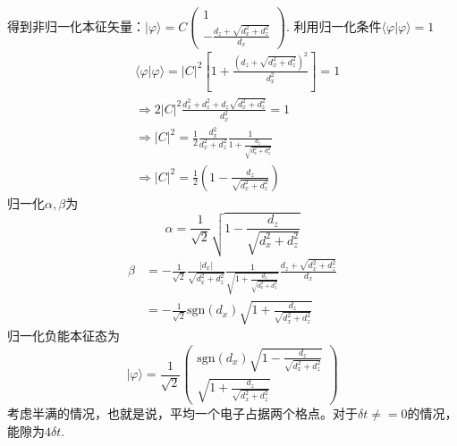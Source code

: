 \documentclass{article}
\numberwithin{equation}{subsection}
\newcommand{\sgn}{\mathrm{sgn}}
\begin{document}
得到非归一化本征矢量：$|\varphi\rangle=C\begin{pmatrix}
    1\\
    -\frac{d_z+\sqrt{d_x^2+d_z^2}}{d_x}
\end{pmatrix}$. 利用归一化条件$\langle\varphi|\varphi\rangle=1$
\begin{equation}
    \begin{split}
        &\langle\varphi|\varphi\rangle=|C|^2\left[1+\frac{(d_z+\sqrt{d_x^2+d_z^2})^2}{d_x^2}\right]=1\\
        &\Longrightarrow 2|C|^2\frac{d_x^2+d_z^2+d_z\sqrt{d_x^2+d_z^2}}{d_x^2}=1\\
        &\Longrightarrow |C|^2=\frac{1}{2}\frac{d_x^2}{d_x^2+d_z^2}\frac{1}{1+\frac{d_z}{\sqrt{d_x^2+d_z^2}}}\\
        &\Longrightarrow |C|^2=\frac{1}{2}(1-\frac{d_z}{\sqrt{d_x^2+d_z^2}})
    \end{split}
\end{equation}
归一化$\alpha,\beta$为
\begin{equation}
    \alpha=\frac{1}{\sqrt{2}}\sqrt{1-\frac{d_z}{\sqrt{d_x^2+d_z^2}}}
\end{equation}
\begin{equation}
    \begin{split}
        \beta&=-\frac{1}{\sqrt{2}}\frac{|d_x|}{\sqrt{d_x^2+d_z^2}}\frac{1}{\sqrt{1+\frac{d_z}{\sqrt{d_x^2+d_z^2}}}}\frac{d_z+\sqrt{d_x^2+d_z^2}}{d_x}\\
        &=-\frac{1}{\sqrt{2}}\sgn(d_x)\sqrt{1+\frac{d_z}{\sqrt{d_x^2+d_z^2}}}
    \end{split}
\end{equation}
归一化负能本征态为
\begin{equation}
    |\varphi\rangle=\frac{1}{\sqrt{2}}\begin{pmatrix}
        \sgn(d_x)\sqrt{1-\frac{d_z}{\sqrt{d_x^2+d_z^2}}}\\
        \sqrt{1+\frac{d_z}{\sqrt{d_x^2+d_z^2}}}
    \end{pmatrix}
\end{equation}
考虑半满的情况，也就是说，平均一个电子占据两个格点。对于$\delta t\neq=0$的情况，能隙为$4\delta t$. 
\end{document}
